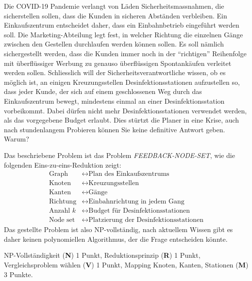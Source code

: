 Die COVID-19 Pandemie verlangt von Läden Sicherheitsmassnahmen, die
sicherstellen sollen, dass die Kunden in sicheren Abständen verbleiben.
Ein Einkaufszentrum entscheidet daher, dass ein Einbahnbetrieb eingeführt werden soll.
Die Marketing-Abteilung legt fest, in welcher Richtung die einzelnen
Gänge zwischen den Gestellen durchlaufen werden können sollen.
Es soll nämlich sichergestellt werden, dass die Kunden immer noch 
in der ``richtigen'' Reihenfolge mit überflüssiger Werbung zu
genauso überflüssigen Spontankäufen verleitet werden sollen.
Schliesslich will der Sicherheitsverantwortliche wissen, ob es möglich
ist, an einigen
Kreuzungsstellen Desinfektionsstationen aufzustellen so,
dass jeder Kunde, der sich auf einem geschlossenen Weg durch das
Einkaufszentrum bewegt, mindestens einmal an einer Desinfektionsstation
vorbeikommt.
Dabei dürfen nicht mehr Desinfektionsstationen verwendet werden, als
das vorgegebene Budget erlaubt.
Dies stürtzt die Planer in eine Krise, auch nach stundenlangem
Probieren können Sie keine definitive Antwort geben.
Warum?


\begin{loesung}
Das beschriebene Problem ist das Problem \textsl{FEEDBACK-NODE-SET},
wie die folgenden Eins-zu-eins-Reduktion zeigt:
\begin{align*}
\text{Graph} &\leftrightarrow \text{Plan des Einkaufszentrums}
\\
\text{Knoten}&\leftrightarrow \text{Kreuzungsstellen}
\\
\text{Kanten}&\leftrightarrow \text{Gänge}
\\
\text{Richtung}&\leftrightarrow \text{Einbahnrichtung in jedem Gang}
\\
\text{Anzahl $k$}&\leftrightarrow \text{Budget für Desinfektionsstationen}
\\
\text{Node set}&\leftrightarrow \text{Platzierung der Desinfektionsstationen}
\end{align*}
Das gestellte Problem ist also NP-vollständig, nach aktuellem Wissen gibt
es daher keinen polynomiellen Algorithmus, der die Frage entscheiden könnte.
\end{loesung}

\begin{bewertung}
NP-Vollständigkeit ({\bf N}) 1 Punkt,
Reduktionsprinzip ({\bf R}) 1 Punkt,
Vergleichsproblem wählen ({\bf V}) 1 Punkt,
Mapping Knoten, Kanten, Stationen ({\bf M}) 3 Punkte.
\end{bewertung}
